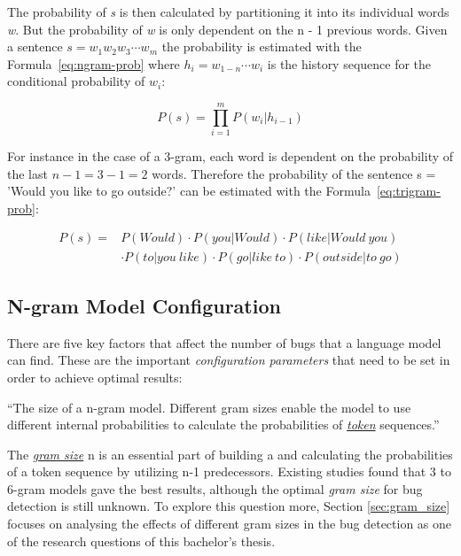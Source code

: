 The probability of \textit{s} is then calculated by partitioning it into its individual words \textit{w}. But the probability of \textit{w} is only dependent on the n - 1 previous words. Given a sentence \( s = w_1w_2w_3\cdots w_m \) the probability is estimated with the Formula~\ref{eq:ngram-prob} where \(h_i = w_{1-n}\cdots w_i \) is the history sequence for the conditional probability of \(w_i\):

\begin{equation} \label{eq:ngram-prob}
P(s) ={} \displaystyle\prod_{i=1}^{m} P(w_i|h_{i-1})
\end{equation}

For instance in the case of a 3-gram, each word is dependent on the probability of the last \(n - 1 = 3 - 1 = 2 \) words. Therefore the probability of the sentence s = 'Would you like to go outside?' can be estimated with the Formula~\ref{eq:trigram-prob}:

\begin{equation}\label{eq:trigram-prob}
\begin{aligned}
P(s) ={} & P(Would)\cdot P(you|Would)\cdot P(like|Would\ you) \\ 
		 & \cdot P(to|you\ like)\cdot P(go|like\ to)\cdot P(outside|to\ go)
\end{aligned}
\end{equation} 
  
\subsection{N-gram Model Configuration}\label{subsec:configuration}
There are five key factors that affect the number of bugs that a language model can find. These are the important \textit{configuration parameters} that need to be set in order to achieve optimal results:  

\begin{definition}\label{def:gram_size}
    ``The size of a n-gram model. Different gram sizes enable the model to use different internal probabilities to calculate the probabilities of \hyperref[def:token]{\textit{token}} sequences.''~\cite{bugram}
\end{definition}

The \hyperref[def:gram_size]{\textit{gram size}} n is an essential part of building a \ngram{} and calculating the probabilities of a token sequence by utilizing n-1 predecessors. Existing studies found that 3 to 6-gram models gave the best results, although the optimal \textit{gram size} for bug detection is still unknown. To explore this question more, Section \ref{sec:gram_size} focuses on analysing the effects of different gram sizes in the \scratch{} bug detection as one of the research questions of this bachelor's thesis.

